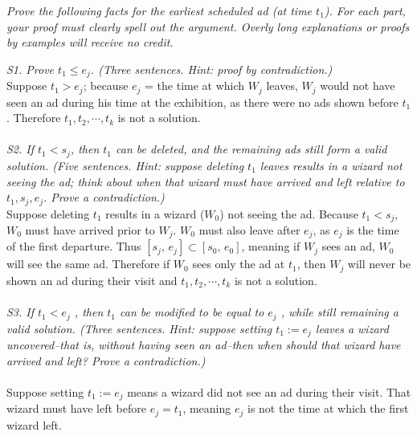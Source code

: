 \documentclass[12pt]{article}
\begin{document}
\begin{enumerate}
\textit{Prove the following facts for the earliest scheduled ad (at time $t_1$). For each part, your proof must clearly spell out the argument. Overly long explanations or proofs by examples will receive no credit.}

\textit{S1. Prove $t_ 1 \le e_j$. (Three sentences. Hint: proof by contradiction.)}\\

Suppose $t_1 > e_j$; because $e_j$ = the time at which $W_j$ leaves, $W_j$ would not have seen an ad during his time at the exhibition, as there were no ads shown before $t_1$.  Therefore $t_1, t_ 2, \cdots, t_k$ is not a solution.
\\\\

\textit{S2. If $t_1 < s_j$, then $t_1$ can be deleted, and the remaining ads still form a valid
solution. (Five sentences. Hint: suppose deleting $t_1$ leaves results in a wizard
not seeing the ad; think about when that wizard must have arrived and left
relative to $t_1, s _j, e_ j$. Prove a contradiction.)}
\\

Suppose deleting $t_1$ results in a wizard ($W_0$) not seeing the ad. Because $t_1 < s_j$, $W_0$ must have arrived prior to $W_j$. $W_0$ must also leave after $e_j$, as $e_j$ is the time of the first departure. Thus $[s_ j,\,e _j] \subset [s_0,\,e_0]$, meaning if $W_j$ sees an ad, $W_0$ will see the same ad. Therefore if $W_0$ sees only the ad at $t_1$, then $W_j$ will never be shown an ad during their visit and $t_1, t_ 2, \cdots, t_k$ is not a solution.
\\\\

\textit{S3. If $t_1 < e_j$ , then $t_1$ can be modified to be equal to $e_j$ , while still remaining
a valid solution. (Three sentences. Hint: suppose setting $t _1 := e _j$ leaves a
wizard uncovered--that is, without having seen an ad--then when should that wizard have arrived and left? Prove a contradiction.)}
\\\\
Suppose setting $t _1 := e _j$ means a wizard did not see an ad during their visit. That wizard must have left before $e_j=t_1$, meaning $e_j$ is not the time at which the first wizard left. 

\pagebreak


\end{enumerate}
\end{document}
